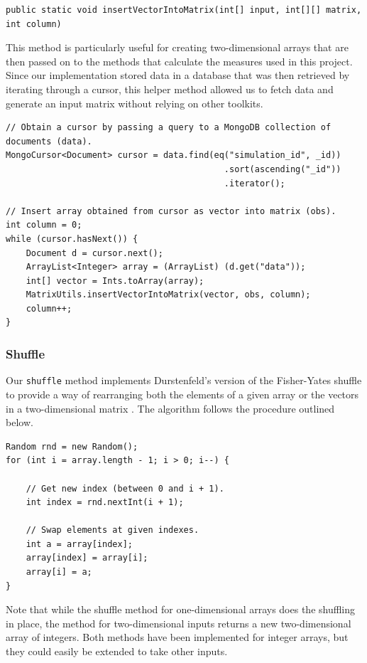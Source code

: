 \documentclass[a4paper,11pt]{article}
\begin{document}
\begin{verbatim}
public static void insertVectorIntoMatrix(int[] input, int[][] matrix, int column)
\end{verbatim}

This method is particularly useful for creating two-dimensional arrays that are then passed on to the methods that calculate the measures used in this project. Since our implementation stored data in a database that was then retrieved by iterating through a cursor, this helper method allowed us to fetch data and generate an input matrix without relying on other toolkits.

\begin{verbatim}
// Obtain a cursor by passing a query to a MongoDB collection of documents (data).
MongoCursor<Document> cursor = data.find(eq("simulation_id", _id))
                                           .sort(ascending("_id"))
                                           .iterator();

// Insert array obtained from cursor as vector into matrix (obs).
int column = 0;
while (cursor.hasNext()) {
	Document d = cursor.next();
	ArrayList<Integer> array = (ArrayList) (d.get("data"));
	int[] vector = Ints.toArray(array);
	MatrixUtils.insertVectorIntoMatrix(vector, obs, column);
	column++;
}
\end{verbatim}

\subsubsection{Shuffle}

Our \texttt{shuffle} method implements Durstenfeld's version of the Fisher-Yates shuffle to provide a way of rearranging both the elements of a given array or the vectors in a two-dimensional matrix \cite{Durstenfeld1964}. The algorithm follows the procedure outlined below.

\begin{verbatim}
Random rnd = new Random();
for (int i = array.length - 1; i > 0; i--) {

	// Get new index (between 0 and i + 1).
	int index = rnd.nextInt(i + 1);

	// Swap elements at given indexes.
	int a = array[index];
	array[index] = array[i];
	array[i] = a;
}
\end{verbatim}

Note that while the shuffle method for one-dimensional arrays does the shuffling in place, the method for two-dimensional inputs returns a new two-dimensional array of integers. Both methods have been implemented for integer arrays, but they could easily be extended to take other inputs. 
\end{document}
